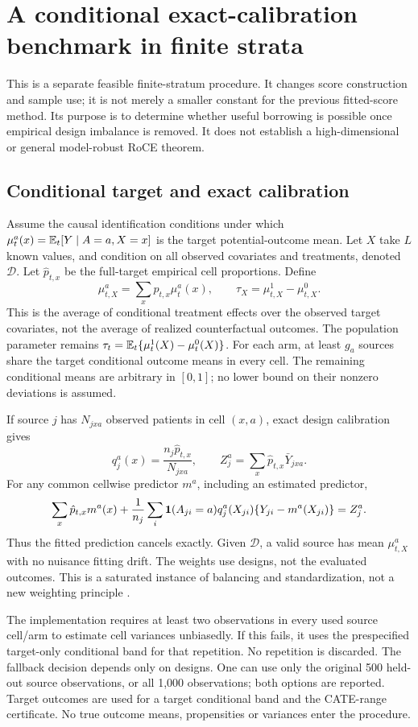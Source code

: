 \section{A conditional exact-calibration benchmark in finite strata}
\label{sec:conditional-standardization}

This is a separate feasible finite-stratum procedure. It changes score
construction and sample use; it is not merely a smaller constant for the
previous fitted-score method. Its purpose is to determine whether useful
borrowing is possible once empirical design imbalance is removed.
It does not establish a high-dimensional or general model-robust RoCE theorem.

\subsection{Conditional target and exact calibration}

Assume the causal identification conditions under which $\mu_t^a(x)=\mathbb E_t[Y\mid A=a,X=x]$ is the target potential-outcome mean.
Let $X$ take $L$ known values, and condition on all observed covariates and
treatments, denoted $\mathcal D$. Let $\hat p_{t,x}$ be the full-target empirical
cell proportions. Define
\[
 \mu_{t,X}^a=\sum_x\hat p_{t,x}\mu_t^a(x),\qquad
 \tau_X=\mu_{t,X}^1-\mu_{t,X}^0.
\]
This is the average of conditional treatment effects over the observed target
covariates, not the average of realized counterfactual outcomes.
The population parameter remains $\tau_t=\mathbb E_t\{\mu_t^1(X)-\mu_t^0(X)\}$.
For each arm, at least $g_a$ sources share the target conditional outcome means
in every cell. The remaining conditional means are arbitrary in $[0,1]$;
no lower bound on their nonzero deviations is assumed.

If source $j$ has $N_{jxa}$ observed patients in cell $(x,a)$, exact design
calibration gives
\[
 q_j^a(x)=\frac{n_j\hat p_{t,x}}{N_{jxa}},\qquad
 Z_j^a=\sum_x\hat p_{t,x}\bar Y_{jxa}.
\]
For any common cellwise predictor $m^a$, including an estimated predictor,
\[
 \sum_x\hat p_{t,x}m^a(x)+\frac1{n_j}\sum_i
 \mathbf 1(A_{ji}=a)q_j^a(X_{ji})\{Y_{ji}-m^a(X_{ji})\}
 =Z_j^a.
\]
Thus the fitted prediction cancels exactly. Given $\mathcal D$, a valid source
has mean $\mu_{t,X}^a$ with no nuisance fitting drift. The weights use designs,
not the evaluated outcomes. This is a saturated instance of balancing and
standardization, not a new weighting principle \citep{sbw2015,arb2018}.

The implementation requires at least two observations in every used source
cell/arm to estimate cell variances unbiasedly. If this fails, it uses the
prespecified target-only conditional band for that repetition. No repetition
is discarded. The fallback decision depends only on designs. One can use
only the original 500 held-out source observations, or all 1,000 observations;
both options are reported. Target outcomes are used for a target conditional
band and the CATE-range certificate. No true outcome means, propensities or
variances enter the procedure.

